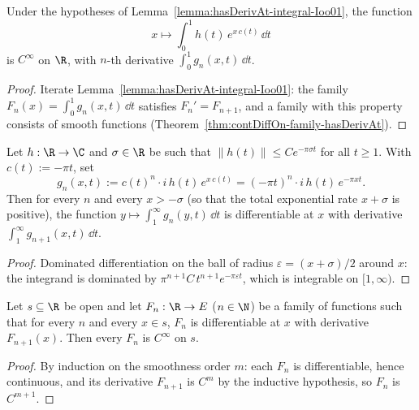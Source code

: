 \begin{theorem}\label{thm:contDiff-integral-Ioo01}\leanok
  Under the hypotheses of Lemma~\ref{lemma:hasDerivAt-integral-Ioo01}, the function
  \[
    x \mapsto \int_0^1 h(t)\, e^{x\, c(t)} \,\dd t
  \]
  is $C^\infty$ on $\R$, with $n$-th derivative $\int_0^1 g_n(x,t)\,\dd t$.
\end{theorem}
\begin{proof}\leanok
  Iterate Lemma~\ref{lemma:hasDerivAt-integral-Ioo01}: the family
  $F_n(x) = \int_0^1 g_n(x,t)\,\dd t$ satisfies $F_n' = F_{n+1}$, and a family with this property
  consists of smooth functions (Theorem~\ref{thm:contDiffOn-family-hasDerivAt}).
\end{proof}

\begin{lemma}\label{lemma:hasDerivAt-integral-IciOne}\leanok
  Let $h : \R \to \C$ and $\sigma \in \R$ be such that
  $\|h(t)\| \le C e^{-\pi \sigma t}$ for all $t \ge 1$. With $c(t) := -\pi t$, set
  \[
    g_n(x, t) := c(t)^n \cdot i\, h(t)\, e^{x\, c(t)}
               = (-\pi t)^n \cdot i\, h(t)\, e^{-\pi x t}.
  \]
  Then for every $n$ and every $x > -\sigma$ (so that the total exponential rate
  $x + \sigma$ is positive), the function $y \mapsto \int_1^\infty g_n(y,t)\,\dd t$ is
  differentiable at $x$ with derivative $\int_1^\infty g_{n+1}(x,t)\,\dd t$.
\end{lemma}
\begin{proof}\leanok
  Dominated differentiation on the ball of radius $\varepsilon = (x + \sigma)/2$ around $x$: the
  integrand is dominated by $\pi^{n+1} C\, t^{n+1} e^{-\pi \varepsilon t}$, which is integrable
  on $[1, \infty)$.
\end{proof}

\begin{theorem}\label{thm:contDiffOn-family-hasDerivAt}\leanok
  Let $s \subseteq \R$ be open and let $F_n : \R \to E$ ($n \in \N$) be a family of functions
  such that for every $n$ and every $x \in s$, $F_n$ is differentiable at $x$ with derivative
  $F_{n+1}(x)$. Then every $F_n$ is $C^\infty$ on $s$.
\end{theorem}
\begin{proof}\leanok
  By induction on the smoothness order $m$: each $F_n$ is differentiable, hence continuous, and
  its derivative $F_{n+1}$ is $C^m$ by the inductive hypothesis, so $F_n$ is $C^{m+1}$.
\end{proof}
